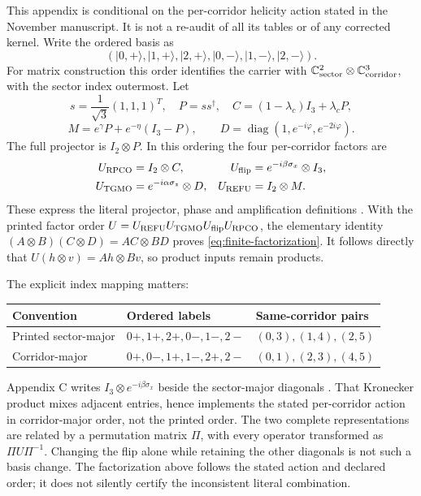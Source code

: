\documentclass[11pt,a4paper]{article}
\theoremstyle{definition}
\newcommand{\C}{\mathbb C}
\numberwithin{equation}{section}
\begin{document}
This appendix is conditional on the per-corridor helicity action stated
in the November manuscript. It is not a re-audit of all its tables or of
any corrected kernel. Write the ordered basis as
\[
 (|0,+\rangle,|1,+\rangle,|2,+\rangle,
  |0,-\rangle,|1,-\rangle,|2,-\rangle).
\]
For matrix construction this order identifies the carrier with
$\C^2_{\rm sector}\otimes\C^3_{\rm corridor}$, with the sector index
outermost. Let
\begin{equation}
 s=\frac1{\sqrt3}(1,1,1)^T,\quad P=ss^\dagger,\quad
 C=(1-\lambda_c)I_3+\lambda_cP,
 \label{eq:finite-C}
\end{equation}
\begin{equation}
 M=e^\gamma P+e^{-\eta}(I_3-P),\qquad
 D=\operatorname{diag}(1,e^{-i\varphi},e^{-2i\varphi}).
 \label{eq:finite-MD}
\end{equation}
The full projector is $I_2\otimes P$. In this ordering the four
per-corridor factors are
\begin{align}
 U_{\rm RPCO}&=I_2\otimes C,&
 U_{\rm flip}&=e^{-i\beta\sigma_x}\otimes I_3,\nonumber\\
 U_{\rm TGMO}&=e^{-i\alpha\sigma_z}\otimes D,&
 U_{\rm REFU}&=I_2\otimes M.
 \label{eq:finite-factors}
\end{align}
These express the literal projector, phase and amplification definitions
\cite[physical pp.~3--6, \S\S2--3]{P15}.
With the printed factor order
$U=U_{\rm REFU}U_{\rm TGMO}U_{\rm flip}U_{\rm RPCO}$,
the elementary identity
$(A\otimes B)(C\otimes D)=AC\otimes BD$
proves \eqref{eq:finite-factorization}.
It follows directly that
$U(h\otimes v)=Ah\otimes Bv$, so product inputs remain products.

The explicit index mapping matters:
\begin{center}
\renewcommand{\arraystretch}{1.2}
\begin{tabular}{@{}lll@{}}
\toprule
Convention & Ordered labels & Same-corridor pairs\\
\midrule
Printed sector-major & $0+,1+,2+,0-,1-,2-$ & $(0,3),(1,4),(2,5)$\\
Corridor-major & $0+,0-,1+,1-,2+,2-$ & $(0,1),(2,3),(4,5)$\\
\bottomrule
\end{tabular}
\end{center}
Appendix C writes $I_3\otimes e^{-i\beta\sigma_x}$ beside the
sector-major diagonals \cite[physical p.~24]{P15}.
That Kronecker product mixes adjacent entries, hence implements the
stated per-corridor action in corridor-major order, not the printed order.
The two complete representations are related by a permutation matrix
$\Pi$, with every operator transformed as $\Pi U\Pi^{-1}$.
Changing the flip alone while retaining the other diagonals is not such
a basis change. The factorization above follows the stated action and
declared order; it does not silently certify the inconsistent literal
combination.
\end{document}
